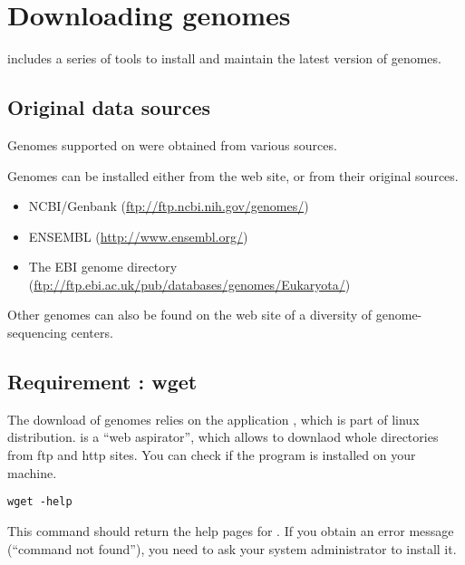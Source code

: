 
\section{Downloading genomes}


\RSAT includes a series of tools to install and maintain the latest
version of genomes.

\subsection{Original data sources}

Genomes supported on \RSAT were obtained from various sources.

Genomes can be installed either from the \RSAT web site, or from their
original sources.  

\begin{itemize}
\item NCBI/Genbank (\url{ftp://ftp.ncbi.nih.gov/genomes/})

\item ENSEMBL (\url{http://www.ensembl.org/})

\item The EBI genome directory (\url{ftp://ftp.ebi.ac.uk/pub/databases/genomes/Eukaryota/})

\end{itemize}

Other genomes can also be found on the web site of a diversity of
genome-sequencing centers.

\subsection{Requirement : wget}

The download of genomes relies on the application ,
which is part of linux distribution.  is a ``web
aspirator'', which allows to downlaod whole directories from ftp and
http sites. You can check if the program is installed on your machine.

\begin{verbatim}
wget -help
\end{verbatim}

This command should return the help pages for .  If you
obtain an error message (``command not found''), you need to ask your
system administrator to install it.

